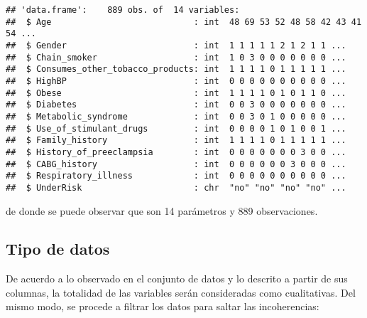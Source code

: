 \documentclass[
  spanish,
]{article}
\begin{document}
\begin{verbatim}
## 'data.frame':    889 obs. of  14 variables:
##  $ Age                            : int  48 69 53 52 48 58 42 43 41 54 ...
##  $ Gender                         : int  1 1 1 1 1 2 1 2 1 1 ...
##  $ Chain_smoker                   : int  1 0 3 0 0 0 0 0 0 0 ...
##  $ Consumes_other_tobacco_products: int  1 1 1 1 0 1 1 1 1 1 ...
##  $ HighBP                         : int  0 0 0 0 0 0 0 0 0 0 ...
##  $ Obese                          : int  1 1 1 1 0 1 0 1 1 0 ...
##  $ Diabetes                       : int  0 0 3 0 0 0 0 0 0 0 ...
##  $ Metabolic_syndrome             : int  0 0 3 0 1 0 0 0 0 0 ...
##  $ Use_of_stimulant_drugs         : int  0 0 0 0 1 0 1 0 0 1 ...
##  $ Family_history                 : int  1 1 1 1 0 1 1 1 1 1 ...
##  $ History_of_preeclampsia        : int  0 0 0 0 0 0 0 3 0 0 ...
##  $ CABG_history                   : int  0 0 0 0 0 0 3 0 0 0 ...
##  $ Respiratory_illness            : int  0 0 0 0 0 0 0 0 0 0 ...
##  $ UnderRisk                      : chr  "no" "no" "no" "no" ...
\end{verbatim}

de donde se puede observar que son 14 parámetros y 889 observaciones.

\newpage

\hypertarget{tipo-de-datos}{%
\subsection{Tipo de datos}\label{tipo-de-datos}}

De acuerdo a lo observado en el conjunto de datos y lo descrito a partir
de sus columnas, la totalidad de las variables serán consideradas como
cualitativas. Del mismo modo, se procede a filtrar los datos para saltar
las incoherencias:
\end{document}
